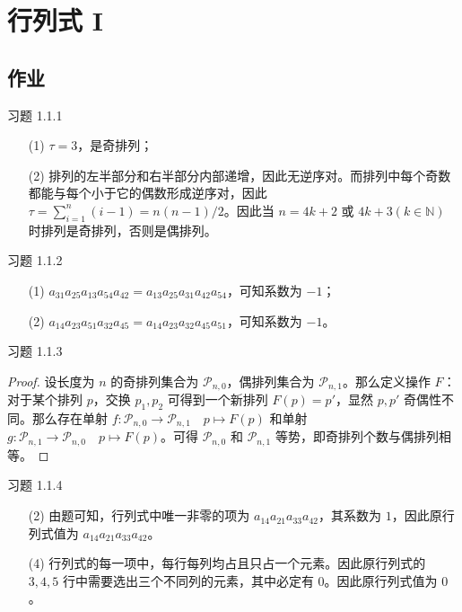 \section{行列式 I}

\subsection{作业}

\begin{problem}
	习题 1.1.1
	\begin{solution}
		\begin{enumerate}
			\item[(1)] $\tau = 3$，是奇排列；
			\item[(2)] 排列的左半部分和右半部分内部递增，因此无逆序对。而排列中每个奇数都能与每个小于它的偶数形成逆序对，因此 $\tau = \sum_{i=1}^n (i-1) = n(n-1)/2$。因此当 $n=4k+2 \text{ 或 } 4k+3 (k \in \mathbb{N})$ 时排列是奇排列，否则是偶排列。
		\end{enumerate}
	\end{solution}
\end{problem}

\begin{problem}
	习题 1.1.2
	\begin{solution}
		\begin{enumerate}
			\item[(1)] $a_{31} a_{25} a_{13} a_{54} a_{42} = a_{13} a_{25} a_{31} a_{42} a_{54}$，可知系数为 $-1$；
			\item[(2)] $a_{14} a_{23} a_{51} a_{32} a_{45} = a_{14} a_{23} a_{32} a_{45} a_{51}$，可知系数为 $-1$。
		\end{enumerate}
	\end{solution}
\end{problem}

\begin{problem}
	习题 1.1.3
	\begin{proof}
		设长度为 $n$ 的奇排列集合为 $\mathscr{P}_{n,0}$，偶排列集合为 $\mathscr{P}_{n,1}$。那么定义操作 $F$：对于某个排列 $p$，交换 $p_1,p_2$ 可得到一个新排列 $F(p)=p'$，显然 $p,p'$ 奇偶性不同。那么存在单射 $f: \mathscr{P}_{n,0} \to \mathscr{P}_{n,1} \quad p \mapsto F(p)$ 和单射 $g: \mathscr{P}_{n,1} \to \mathscr{P}_{n,0} \quad p \mapsto F(p)$。可得 $\mathscr{P}_{n,0}$ 和 $\mathscr{P}_{n,1}$ 等势，即奇排列个数与偶排列相等。
	\end{proof}
\end{problem}

\begin{problem}
	习题 1.1.4
	\begin{solution}
		\begin{enumerate}
			\item[(2)] 由题可知，行列式中唯一非零的项为 $a_{14} a_{21} a_{33} a_{42}$，其系数为 $1$，因此原行列式值为 $a_{14} a_{21} a_{33} a_{42}$。
			\item[(4)] 行列式的每一项中，每行每列均占且只占一个元素。因此原行列式的 $3,4,5$ 行中需要选出三个不同列的元素，其中必定有 $0$。因此原行列式值为 $0$。
		\end{enumerate}
	\end{solution}
\end{problem}

